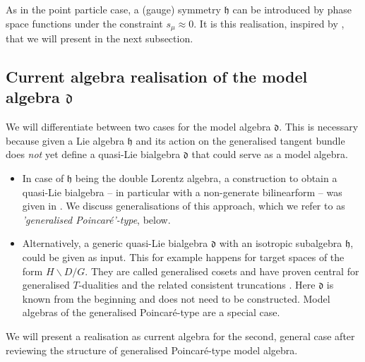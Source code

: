 \documentclass[11pt,a4paper]{article}
\numberwithin{equation}{section}
\begin{document}
As in the point particle case, a (gauge) symmetry $\mathfrak{h}$ can be introduced by phase space functions under the constraint $s_\mu \approx 0$. It is this realisation, inspired by \cite{Polacek:2013nla}, that we will present in the next subsection. %

\subsection{Current algebra realisation of the model algebra \texorpdfstring{$\mathfrak{d}$}{d}} \label{chap:GeneralisedCartanGeometryModelBialgebra}
We will differentiate between two cases for the model algebra $\mathfrak{d}$. This is necessary because given a Lie algebra $\mathfrak{h}$ and its action on the generalised tangent bundle does \textit{not} yet define a quasi-Lie bialgebra $\mathfrak{d}$ that could serve as a model algebra.
\begin{itemize}
	\item In case of $\mathfrak{h}$ being the double Lorentz algebra, a construction to obtain a quasi-Lie bialgebra -- in particular with a non-generate bilinearform -- was given in \cite{Polacek:2013nla}. We discuss generalisations of this approach, which we refer to as \textit{'generalised Poincar\'e'-type}, below. 
  \item Alternatively, a generic quasi-Lie bialgebra $\mathfrak{d}$ with an isotropic subalgebra $\mathfrak{h}$, could be given as input. This for example happens for target spaces of the form $H\backslash D /G$. They are called generalised cosets \cite{Demulder:2019vvh} and have proven central for generalised $T$-dualities and the related consistent truncations \cite{Butter:2022iza}. Here $\mathfrak{d}$ is known from the beginning and does not need to be constructed. Model algebras of the generalised Poincar\'e-type are a special case.
\end{itemize}
We will present a realisation as current algebra for the second, general case after reviewing the structure of generalised Poincar\'e-type model algebra. 
\end{document}
